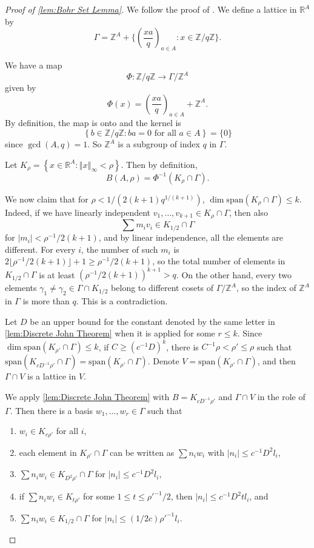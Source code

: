 \documentclass[12pt, a4paper]{amsart}
\numberwithin{equation}{section}
\theoremstyle{definition}
\newcommand{\R}{\mathbb{R}}
\newcommand{\Z}{\mathbb{Z}}
\newcommand{\n}[1]{\left\Vert #1\right\Vert }
\newcommand{\spann}{\mathrm{span}}
\begin{document}
\begin{proof}[Proof of \cref{lem:Bohr Set Lemma}]
We follow the proof of \cite[Lemma~4.22]{tao2006additive}.
We define a lattice in $\R^{A}$ by 
\[
\Gamma=\Z^{A}+\Big\{\left(\frac{x a}{q}\right)_{a\in A}:x\in\Z/q\Z\Big\}.
\]

We have a map 
\[
\Phi\colon \Z/q\Z\to\Gamma/\Z^{A}
\]
given by 
\[
\Phi(x)=\left(\frac{xa}{q}\right)_{a\in A}+\Z^{A}.
\]
By definition, the map is onto and the kernel is
\[
\left\{ b\in\Z/q\Z:ba=0\text{ for all $a\in A$}\right\}=\{0\}
\]
since $\gcd(A,q)=1$.
So $\Z^{A}$ is a subgroup of index $q$ in $\Gamma$. 

Let $K_{\rho}=\left\{ x\in\R^{A}:\n x_{\infty}<\rho\right\}$. Then
by definition,
\[
B(A,\rho)=\Phi^{-1}(K_{\rho}\cap\Gamma).
\]

We now claim that for $\rho<1/(2(k+1)q^{1/(k+1)})$,
$\dim\spann (K_{\rho}\cap\Gamma)\le k$.
Indeed, if we have linearly independent $v_{1},\ldots,v_{k+1}\in K_{\rho}\cap\Gamma$,
then also 
\[
\sum m_{i}v_{i}\in K_{1/2}\cap\Gamma
\]
for $|m_{i}|<\rho^{-1}/2(k+1)$, and by linear independence, all the elements are different. 
For every $i$, the number of such $m_{i}$ is $2\lfloor\rho^{-1}/2(k+1)\rfloor+1\ge\rho^{-1}/2(k+1)$,
so the total number of elements in $K_{1/2}\cap\Gamma$ is at least $(\rho^{-1}/2(k+1))^{k+1}>q$. 
On the other hand, every two elements $\gamma_1\ne \gamma_2 \in \Gamma \cap K_{1/2}$ belong to different cosets of $\Gamma / \Z^A$, so the index of $\Z^A$ in $\Gamma$ is more than $q$. 
This is a contradiction.

Let $D$ be an upper bound for the constant denoted by the same letter in
\cref{lem:Discrete John Theorem} when it is applied for some $r\le k$.
Since $\dim \spann (K_{\rho'}\cap\Gamma) \le k$, if $C\ge\left(c^{-1}D\right)^{k}$, there is $C^{-1}\rho<\rho'\le\rho$ such that $\spann (K_{cD^{-1}\rho'}\cap\Gamma)=\spann (K_{\rho'}\cap\Gamma)$.
Denote $V=\spann(K_{\rho'}\cap\Gamma)$, and then $\Gamma\cap V$ is a lattice in $V$. 

We apply \cref{lem:Discrete John Theorem} with $B=K_{cD^{-1}\rho'}$ and
$\Gamma\cap V$ in the role of $\Gamma$.
Then there is a basis $w_{1},\ldots,w_{r}\in \Gamma$ such that
\begin{enumerate}
\item $w_i\in K_{c\rho'}$ for all $i$,
\item[(2.i)] each element in $K_{\rho'}\cap\Gamma$ can be written as $\sum n_{i}w_{i}$ with $\left|n_{i}\right|\le c^{-1}D^2l_{i}$,
\item[(2.ii)] $\sum n_{i}w_{i}\in K_{D^2\rho'}\cap\Gamma$ for $\left|n_{i}\right|\le c^{-1}D^2l_{i}$,
\item[(3)] if $\sum n_{i}w_{i}\in K_{t\rho'}$ for some $1\le t\le {\rho'}^{-1}/2$, then $\left|n_{i}\right|\le c^{-1}D^2 t l_i$, and
\item[(4)] $\sum n_{i}w_{i}\in K_{1/2}\cap\Gamma$ for $\left|n_{i}\right| \le (1/2c){\rho'}^{-1}l_i$.
\end{enumerate}



\end{proof}
\end{document}
